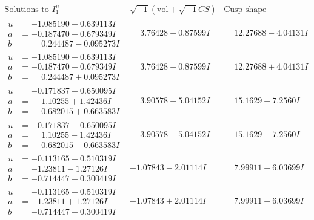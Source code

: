 \documentclass[1p]{elsarticle_modified}
\theoremstyle{definition}
\newcommand{\I}{\sqrt{-1}}
\begin{document}
$$\begin{array}{c|c|c}  
\text{Solutions to }I^u_{1}& \I (\text{vol} + \sqrt{-1}CS) & \text{Cusp shape}\\
 \hline 
\begin{aligned}
u &= -1.085190 + 0.639113 I \\
a &= -0.187470 - 0.679349 I \\
b &= \phantom{-}0.244487 - 0.095273 I\end{aligned}
 & \phantom{-}3.76428 + 0.87599 I & \phantom{-}12.27688 - 4.04131 I \\ \hline\begin{aligned}
u &= -1.085190 - 0.639113 I \\
a &= -0.187470 + 0.679349 I \\
b &= \phantom{-}0.244487 + 0.095273 I\end{aligned}
 & \phantom{-}3.76428 - 0.87599 I & \phantom{-}12.27688 + 4.04131 I \\ \hline\begin{aligned}
u &= -0.171837 + 0.650095 I \\
a &= \phantom{-}1.10255 + 1.42436 I \\
b &= \phantom{-}0.682015 + 0.663583 I\end{aligned}
 & \phantom{-}3.90578 - 5.04152 I & \phantom{-}15.1629 + 7.2560 I \\ \hline\begin{aligned}
u &= -0.171837 - 0.650095 I \\
a &= \phantom{-}1.10255 - 1.42436 I \\
b &= \phantom{-}0.682015 - 0.663583 I\end{aligned}
 & \phantom{-}3.90578 + 5.04152 I & \phantom{-}15.1629 - 7.2560 I \\ \hline\begin{aligned}
u &= -0.113165 + 0.510319 I \\
a &= -1.23811 - 1.27126 I \\
b &= -0.714447 - 0.300419 I\end{aligned}
 & -1.07843 - 2.01114 I & \phantom{-}7.99911 + 6.03699 I \\ \hline\begin{aligned}
u &= -0.113165 - 0.510319 I \\
a &= -1.23811 + 1.27126 I \\
b &= -0.714447 + 0.300419 I\end{aligned}
 & -1.07843 + 2.01114 I & \phantom{-}7.99911 - 6.03699 I \\ \hline\begin{aligned}

\end{aligned}
\end{array}$$
\end{document}
